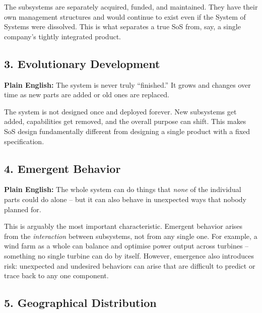 The subsystems are separately acquired, funded, and maintained. They have
their own management structures and would continue to exist even if the
System of Systems were dissolved. This is what separates a true SoS from, say,
a single company's tightly integrated product.

\subsection{3. Evolutionary Development}

\begin{mdframed}[backgroundcolor=lightgray, linewidth=0pt, innertopmargin=6pt,
innerbottommargin=6pt]
\textbf{Plain English:} The system is never truly ``finished.'' It grows and
changes over time as new parts are added or old ones are replaced.
\end{mdframed}

The system is not designed once and deployed forever. New subsystems get added,
capabilities get removed, and the overall purpose can shift. This makes SoS
design fundamentally different from designing a single product with a fixed
specification.

\subsection{4. Emergent Behavior}

\begin{mdframed}[backgroundcolor=lightgray, linewidth=0pt, innertopmargin=6pt,
innerbottommargin=6pt]
\textbf{Plain English:} The whole system can do things that \emph{none} of the
individual parts could do alone -- but it can also behave in unexpected ways
that nobody planned for.
\end{mdframed}

This is arguably the most important characteristic. Emergent behavior arises
from the \emph{interaction} between subsystems, not from any single one. For
example, a wind farm as a whole can balance and optimise power output across
turbines -- something no single turbine can do by itself. However, emergence
also introduces risk: unexpected and undesired behaviors can arise that are
difficult to predict or trace back to any one component.

\subsection{5. Geographical Distribution}

